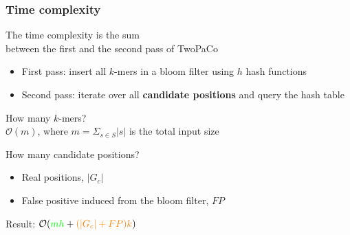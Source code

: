 \begin{frame}
  
	\frametitle{Time complexity}

  \centering
	
	The time complexity is the sum \\ between the first and the second pass of TwoPaCo \\
	
	\bigskip
	
	\begin{itemize}
	  \item[\textcolor{green}{\textbullet}]First pass: insert all $k$-mers in a bloom filter using $h$ hash functions
	  \item[\textcolor{orange}{\textbullet}] Second pass: iterate over all \textbf{candidate positions} and query the hash table
	\end{itemize}
	
	\bigskip
	
	How many $k$-mers? \\
	
	$\mathcal{O}(m)$, where $m = \Sigma_{s \in S}{ |s| }$ is the total input size
	
	\bigskip
	 
	How many candidate positions?
	
	\begin{itemize}
	  \item Real positions, $|G_{c}|$
	  \item False positive induced from the bloom filter, $FP$
	\end{itemize}

	\medskip
	
	Result: $\mathcal{O}({\color{green}mh} + {\color{orange}(|G_{c}| + FP)k})$
	
	
\end{frame}



